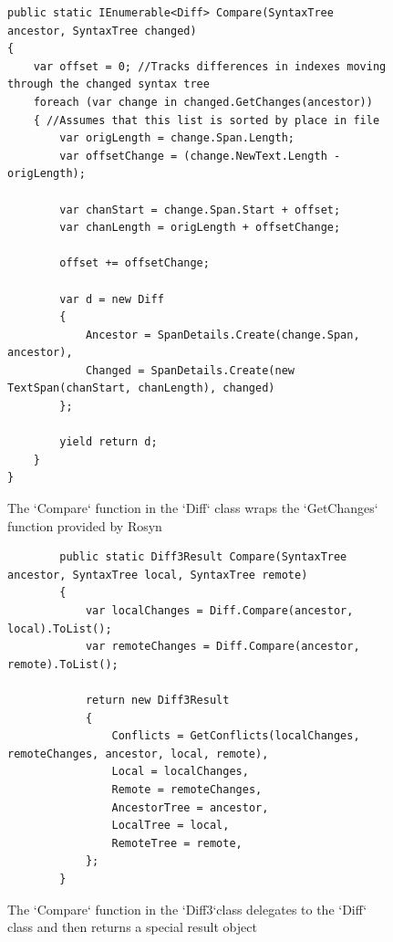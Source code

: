 \documentclass[draftclsnofoot,onecolumn]{IEEEtran}
\begin{document}
\begin{figure}[!t]
\centering
\begin{lstlisting}
public static IEnumerable<Diff> Compare(SyntaxTree ancestor, SyntaxTree changed)
{
    var offset = 0; //Tracks differences in indexes moving through the changed syntax tree
    foreach (var change in changed.GetChanges(ancestor))
    { //Assumes that this list is sorted by place in file
        var origLength = change.Span.Length;
        var offsetChange = (change.NewText.Length - origLength);

        var chanStart = change.Span.Start + offset;
        var chanLength = origLength + offsetChange;

        offset += offsetChange;

        var d = new Diff
        {
            Ancestor = SpanDetails.Create(change.Span, ancestor),
            Changed = SpanDetails.Create(new TextSpan(chanStart, chanLength), changed)
        };

        yield return d;
    }
}
\end{lstlisting}
\caption{The `Compare` function in the `Diff` class wraps the `GetChanges` 
function provided by Rosyn}
\label{diffcompare}
\end{figure}

\begin{figure}[!t]
\centering
\begin{lstlisting}
        public static Diff3Result Compare(SyntaxTree ancestor, SyntaxTree local, SyntaxTree remote)
        {
            var localChanges = Diff.Compare(ancestor, local).ToList();
            var remoteChanges = Diff.Compare(ancestor, remote).ToList();

            return new Diff3Result
            {
                Conflicts = GetConflicts(localChanges, remoteChanges, ancestor, local, remote),
                Local = localChanges,
                Remote = remoteChanges,
                AncestorTree = ancestor,
                LocalTree = local,
                RemoteTree = remote,
            };
        }
\end{lstlisting}
\caption{The `Compare` function in the `Diff3`class delegates to the `Diff` class and then returns a special result object}
\label{diff3compare}
\end{figure}
\end{document}
